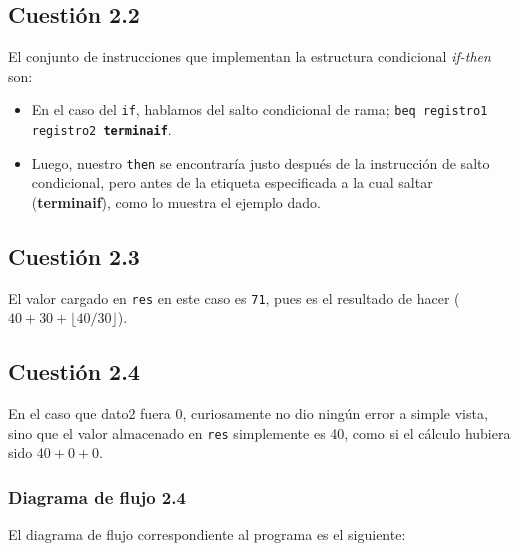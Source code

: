 \documentclass[11pt]{article}
\begin{document}
\begin{large}
\begin{flushleft}
\subsection*{Cuestión 2.2}
El conjunto de instrucciones que implementan la estructura condicional \textit{if-then} son:

\begin{itemize}
    \item En el caso del \texttt{if}, hablamos del salto condicional de rama; \texttt{beq registro1 registro2 \textbf{terminaif}}.
    \item Luego, nuestro \texttt{then} se encontraría justo después de la instrucción de salto condicional, pero antes de la etiqueta especificada a la cual saltar (\textbf{terminaif}), como lo muestra el ejemplo dado.
\end{itemize}


\subsection*{Cuestión 2.3}
El valor cargado en \texttt{res} en este caso es \texttt{71}, pues es el resultado de hacer (\texttt{$40+30+\lfloor40/30\rfloor$}).


\subsection*{Cuestión 2.4}
En el caso que dato2 fuera 0, curiosamente no dio ningún error a simple vista, sino que el valor almacenado en \texttt{res} simplemente es 40, como si el cálculo hubiera sido \texttt{$40+0+0$}.

\subsubsection*{Diagrama de flujo 2.4}
El diagrama de flujo correspondiente al programa es el siguiente:


\end{flushleft}
\end{large}
\end{document}
